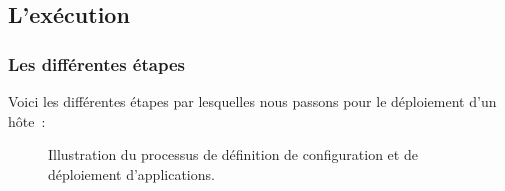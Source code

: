 \subsection{L'exécution}

\subsubsection{Les différentes étapes}

Voici les différentes étapes par lesquelles nous passons pour le déploiement d'un hôte~:

\begin{figure}
	\centerfloat
	\caption{Illustration du processus de définition de configuration et de déploiement d'applications.}
	\label{1.4_definition_runlist}
	
\end{figure}

